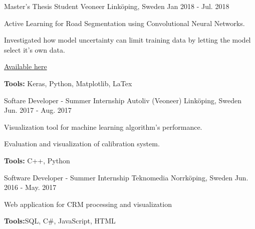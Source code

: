 \begin{cventries}
  \cventry
    {Master's Thesis Student} %
    {Veoneer} %
    {Linköping, Sweden} %
    {Jan 2018 - Jul. 2018} %
    {
      \begin{cvitems} %
        \item {Active Learning for Road Segmentation using Convolutional Neural Networks.}
        \item {Investigated how model uncertainty can limit training data by letting the model select it's own data.}
        \item {\href{https://liu.diva-portal.org/smash/get/diva2:1259079/FULLTEXT01.pdf}{Available here}}
        \item {\textbf{Tools:} Keras, Python, Matplotlib, LaTex}
      \end{cvitems}
    }

  \cventry
    {Softare Developer - Summer Internship} %
    {Autoliv (Veoneer)} %
    {Linköping, Sweden} %
    {Jun. 2017 - Aug. 2017} %
    {
      \begin{cvitems} %
        \item {Visualization tool for machine learning algorithm's performance.}
        \item {Evaluation and visualization of calibration system.}
        \item {\textbf{Tools:} C++, Python}
      \end{cvitems}
    }

  \cventry
    {Software Developer - Summer Internship} %
    {Teknomedia} %
    {Norrköping, Sweden} %
    {Jun. 2016 - May. 2017} %
    {
      \begin{cvitems} %
        \item {Web application for CRM processing and visualization}
        \item {\textbf{Tools:}SQL, C\#, JavaScript, HTML}
      \end{cvitems}
    }

\end{cventries}

